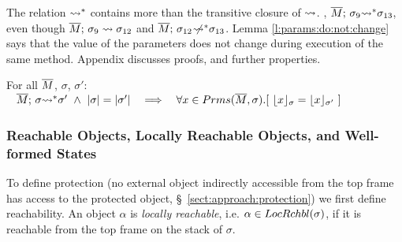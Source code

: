 \vspace{.1cm}
{The relation ${\rightsquigarrow^*}$ contains more than the transitive closure of  $\rightsquigarrow$.
\Eg, ${\overline{M};\, {\sigma_9} {\rightsquigarrow^*} \sigma_{13}}$, even though ${\overline{M};\, {\sigma_{9}} \rightsquigarrow \sigma_{12}}$  and ${\overline{M};\, {\sigma_{12}} \not\!\!\!{\rightsquigarrow^*} \sigma_{13}}$.} 
%
Lemma \ref{l:params:do:not:change} says that the value of the parameters does not change during  execution of the same method. 
Appendix  discusses proofs, and further properties.%
 



\begin{lemma}
\label{l:params:do:not:change} 
 
For all $\overline{M}$, $\sigma$, $\sigma'$:
 $\strut \hspace{0.3cm} \leadstoBoundedStar {\Mtwo}  {\sigma}  {\sigma'} \ \wedge  \ \DepthFs{\sigma}=\DepthFs {\sigma'}\ \ \ \Longrightarrow\ \  \ \forall x\in \Formals {\Mtwo} {\sigma}.[ \ \interpret \sigma x = \interpret {\sigma'} x \ ]$

\end{lemma}
 






\subsubsection{Reachable  Objects, Locally Reachable Objects, and Well-formed States}

To define protection (no external object indirectly accessible from the top frame
has access to the protected object, \cf \S~\ref{sect:approach:protection}) we first define
reachability. %
%  
%
An object
$\alpha$ is
 \emph{locally reachable}, i.e. $\alpha \in  LocRchbl(\sigma) $, if it is reachable from the top frame on the stack of $\sigma$.
 
